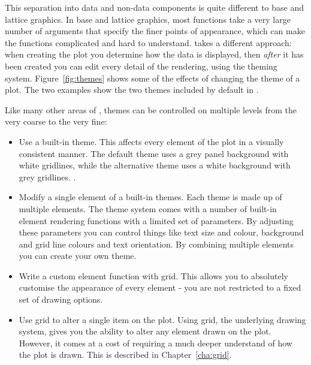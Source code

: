 This separation into data and non-data components is quite different to base and lattice graphics.  In base and lattice graphics, most functions take a very large number of arguments that specify the finer points of appearance, which can make the functions complicated and hard to understand.  \ggplot takes a different approach: when creating the plot you determine how the data is displayed, then {\em after} it has been created you can edit every detail of the rendering, using the theming system.  \noindent Figure~\ref{fig:themes} shows some of the effects of changing the theme of a plot.  The two examples show the two themes included by default in \ggplot.

% 


Like many other areas of \ggplot, themes can be controlled on multiple levels from the very coarse to the very fine:

\begin{itemize}
  \item Use a built-in theme.  This affects every element of the plot in a visually consistent manner.  The default theme uses a grey panel background with white gridlines, while the alternative theme uses a white background with grey gridlines.  .

  \item Modify a single element of a built-in themes. Each theme is made up of multiple elements. The theme system comes with a number of built-in element rendering functions with a limited set of parameters.  By adjusting these parameters you can control things like text size and colour, background and grid line colours and text orientation.  By combining multiple elements you can create your own theme.
  
  \item Write a custom element function with grid.  This allows you to absolutely customise the appearance of every element - you are not restricted to a fixed set of drawing options.  

  \item Use grid to alter a single item on the plot.  Using grid, the underlying drawing system, gives you the ability to alter any element drawn on the plot.  However, it comes at a cost of requiring a much deeper understand of how the plot is drawn.  This is described in Chapter~\ref{cha:grid}.
  
\end{itemize}

